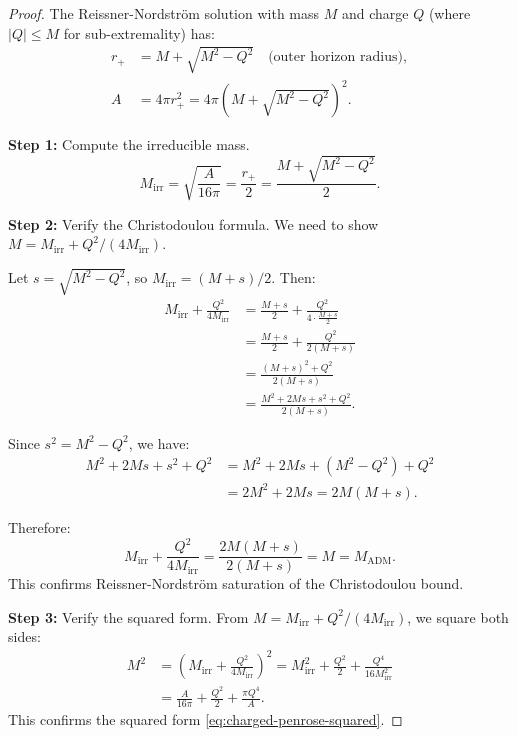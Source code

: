 \documentclass[12pt]{article}
\theoremstyle{plain}
\theoremstyle{definition}
\theoremstyle{remark}
\newcommand{\ADM}{\mathrm{ADM}}
\begin{document}
\begin{proof}
The Reissner-Nordstr\"om solution with mass $M$ and charge $Q$ (where $|Q| \leq M$ for sub-extremality) has:
\begin{align}
    r_+ &= M + \sqrt{M^2 - Q^2} \quad \text{(outer horizon radius)}, \\
    A &= 4\pi r_+^2 = 4\pi(M + \sqrt{M^2 - Q^2})^2.
\end{align}

\textbf{Step 1:} Compute the irreducible mass.
\[
M_{\mathrm{irr}} = \sqrt{\frac{A}{16\pi}} = \frac{r_+}{2} = \frac{M + \sqrt{M^2 - Q^2}}{2}.
\]

\textbf{Step 2:} Verify the Christodoulou formula.
We need to show $M = M_{\mathrm{irr}} + Q^2/(4M_{\mathrm{irr}})$.

Let $s = \sqrt{M^2 - Q^2}$, so $M_{\mathrm{irr}} = (M + s)/2$. Then:
\begin{align}
M_{\mathrm{irr}} + \frac{Q^2}{4M_{\mathrm{irr}}} &= \frac{M + s}{2} + \frac{Q^2}{4 \cdot \frac{M+s}{2}} \\
&= \frac{M + s}{2} + \frac{Q^2}{2(M+s)} \\
&= \frac{(M + s)^2 + Q^2}{2(M+s)} \\
&= \frac{M^2 + 2Ms + s^2 + Q^2}{2(M+s)}.
\end{align}

Since $s^2 = M^2 - Q^2$, we have:
\begin{align}
M^2 + 2Ms + s^2 + Q^2 &= M^2 + 2Ms + (M^2 - Q^2) + Q^2 \\
&= 2M^2 + 2Ms = 2M(M + s).
\end{align}

Therefore:
\[
M_{\mathrm{irr}} + \frac{Q^2}{4M_{\mathrm{irr}}} = \frac{2M(M + s)}{2(M+s)} = M = M_{\ADM}.
\]
This confirms Reissner-Nordstr\"om saturation of the Christodoulou bound.

\textbf{Step 3:} Verify the squared form.
From $M = M_{\mathrm{irr}} + Q^2/(4M_{\mathrm{irr}})$, we square both sides:
\begin{align}
M^2 &= \left(M_{\mathrm{irr}} + \frac{Q^2}{4M_{\mathrm{irr}}}\right)^2 = M_{\mathrm{irr}}^2 + \frac{Q^2}{2} + \frac{Q^4}{16M_{\mathrm{irr}}^2} \\
&= \frac{A}{16\pi} + \frac{Q^2}{2} + \frac{\pi Q^4}{A}.
\end{align}
This confirms the squared form \eqref{eq:charged-penrose-squared}.
\end{proof}
\end{document}
